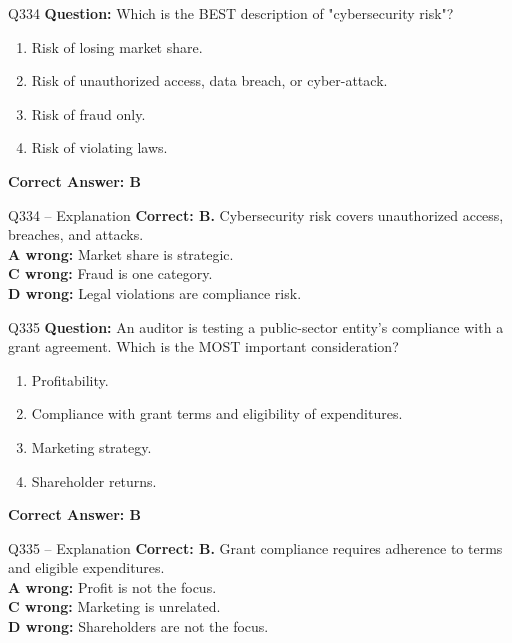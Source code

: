 \documentclass[aspectratio=169,10pt]{beamer}
\begin{document}
	\begin{frame}[t]{Q334}
		\small
		\textbf{Question:} Which is the BEST description of "cybersecurity risk"?
		\begin{enumerate}[label=\Alph*.,itemsep=1pt,topsep=2pt]
			\item Risk of losing market share.
			\item Risk of unauthorized access, data breach, or cyber-attack.
			\item Risk of fraud only.
			\item Risk of violating laws.
		\end{enumerate}
		\vspace{4pt}
		\textbf{Correct Answer: B}
	\end{frame}
	
	\begin{frame}[t]{Q334 -- Explanation}
		\small
		\textbf{Correct: B.} Cybersecurity risk covers unauthorized access, breaches, and attacks. \\[4pt]
		\textbf{A wrong:} Market share is strategic. \\[2pt]
		\textbf{C wrong:} Fraud is one category. \\[2pt]
		\textbf{D wrong:} Legal violations are compliance risk.
	\end{frame}
	
	\begin{frame}[t]{Q335}
		\small
		\textbf{Question:} An auditor is testing a public-sector entity's compliance with a grant agreement. Which is the MOST important consideration?
		\begin{enumerate}[label=\Alph*.,itemsep=1pt,topsep=2pt]
			\item Profitability.
			\item Compliance with grant terms and eligibility of expenditures.
			\item Marketing strategy.
			\item Shareholder returns.
		\end{enumerate}
		\vspace{4pt}
		\textbf{Correct Answer: B}
	\end{frame}
	
	\begin{frame}[t]{Q335 -- Explanation}
		\small
		\textbf{Correct: B.} Grant compliance requires adherence to terms and eligible expenditures. \\[4pt]
		\textbf{A wrong:} Profit is not the focus. \\[2pt]
		\textbf{C wrong:} Marketing is unrelated. \\[2pt]
		\textbf{D wrong:} Shareholders are not the focus.
	\end{frame}
	
\end{document}
